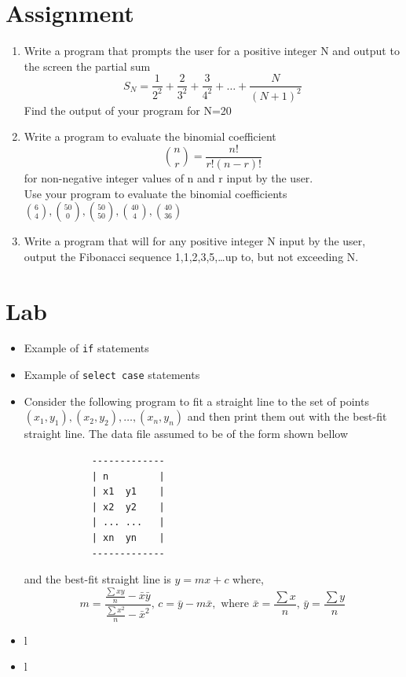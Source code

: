 \documentclass[12pt,oneside]{book}
\newcommand{\code}[1]{\lstinline[keywordstyle=\color{black},basicstyle=\ttfamily]{#1}}
\begin{document}
    \part{Assignment}
    \begin{enumerate}
        \item Write a program that prompts the user for a positive integer N and output to the screen the partial sum
        \[S_N=\frac{1}{2^2}+\frac{2}{3^2}+\frac{3}{4^2}+\dots+\frac{N}{(N+1)^2}\]
        Find the output of your program for N=20
        \item Write a program to evaluate the binomial coefficient
         \[\binom{n}{r}=\frac{n!}{r!(n-r)!}\] for non-negative integer values of n and r input by the user.\\
        Use your program to evaluate the binomial coefficients $\displaystyle \binom{6}{4},\binom{50}{0},\binom{50}{50},\binom{40}{4},\binom{40}{36} $ 
        \item Write a program that will for any positive integer N input by the user, output the Fibonacci sequence 1,1,2,3,5,\dots up to, but not exceeding N.
    \end{enumerate}
    \part{Lab}
    \begin{itemize}
        \item Example of \code{if} statements\newpage
        \item Example of \code{select case} statements\newpage
        \item Consider the following program to fit a straight line to the set of points $ (x_1, y_1), (x_2, y_2),\dots,(x_n, y_n) $ and then print them out with the best-fit straight line. The data file assumed to be of the form shown bellow 
        \begin{verbatim}
            -------------
            | n         |
            | x1  y1    |
            | x2  y2    |
            | ... ...   |
            | xn  yn    |
            -------------
        \end{verbatim}
        and the best-fit straight line is $ y=mx+c $ where,
        $$ m=\frac{\frac{\sum xy}{n}-\bar{x}\bar{y}}{\frac{\sum x^2}{n}-\bar{x}^2},\, c=\bar{y}-m\bar{x}, \text{ where } \bar{x}=\frac{\sum x}{n},\, \bar{y}=\frac{\sum y}{n}$$
        
        \item l
        \item l
    \end{itemize}
    
\end{document}
